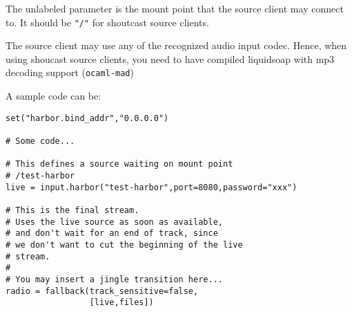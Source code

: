 The unlabeled parameter is the mount point that the source client may connect
to. It should be \verb+"/"+ for shoutcast source clients.

The source client may use any of the recognized audio input codec. Hence, when using shoucast source clients, you need to have compiled liquidsoap with mp3 decoding support (\verb+ocaml-mad+)

A sample code can be:

\begin{verbatim}
set("harbor.bind_addr","0.0.0.0")

# Some code...

# This defines a source waiting on mount point 
# /test-harbor
live = input.harbor("test-harbor",port=8080,password="xxx")

# This is the final stream.
# Uses the live source as soon as available,
# and don't wait for an end of track, since 
# we don't want to cut the beginning of the live
# stream.
#
# You may insert a jingle transition here...
radio = fallback(track_sensitive=false,
                 [live,files])
\end{verbatim}
